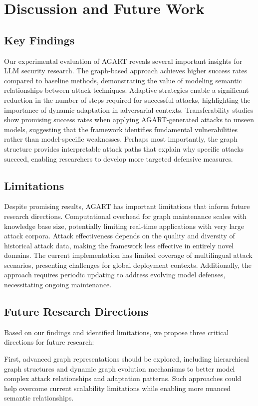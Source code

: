 \section{Discussion and Future Work}

\subsection{Key Findings}
Our experimental evaluation of AGART reveals several important insights for LLM security research. The graph-based approach achieves higher success rates compared to baseline methods, demonstrating the value of modeling semantic relationships between attack techniques. Adaptive strategies enable a significant reduction in the number of steps required for successful attacks, highlighting the importance of dynamic adaptation in adversarial contexts. Transferability studies show promising success rates when applying AGART-generated attacks to unseen models, suggesting that the framework identifies fundamental vulnerabilities rather than model-specific weaknesses. Perhaps most importantly, the graph structure provides interpretable attack paths that explain why specific attacks succeed, enabling researchers to develop more targeted defensive measures.

\subsection{Limitations}
Despite promising results, AGART has important limitations that inform future research directions. Computational overhead for graph maintenance scales with knowledge base size, potentially limiting real-time applications with very large attack corpora. Attack effectiveness depends on the quality and diversity of historical attack data, making the framework less effective in entirely novel domains. The current implementation has limited coverage of multilingual attack scenarios, presenting challenges for global deployment contexts. Additionally, the approach requires periodic updating to address evolving model defenses, necessitating ongoing maintenance.

\subsection{Future Research Directions}
Based on our findings and identified limitations, we propose three critical directions for future research:

First, advanced graph representations should be explored, including hierarchical graph structures and dynamic graph evolution mechanisms to better model complex attack relationships and adaptation patterns. Such approaches could help overcome current scalability limitations while enabling more nuanced semantic relationships.

